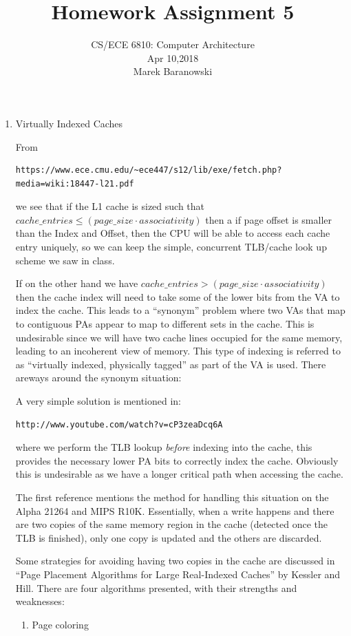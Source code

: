 \documentclass[a4paper, 11pt]{exam}
\title{Homework Assignment 5}
\subtitle{CS/ECE 6810: Computer Architecture \\
Apr 10,2018\\
Marek Baranowski}
\begin{document}
\maketitle
\begin{enumerate}
\item Virtually Indexed Caches

From 
\begin{verbatim}
https://www.ece.cmu.edu/~ece447/s12/lib/exe/fetch.php?media=wiki:18447-l21.pdf
\end{verbatim}
we see that if the L1 cache is sized such that 
$cache\_entries\le(page\_size\cdot associativity)$ then a if page offset is smaller
than the Index and Offset, then the CPU will be able to access each cache
entry uniquely, so we can keep the simple, concurrent TLB/cache look up scheme
we saw in class.

If on the other hand we have $cache\_entries>(page\_size\cdot associativity)$
then the cache index will need to take some of the lower bits from the VA to
index the cache. This leads to a ``synonym'' problem where two VAs that map
to contiguous PAs appear to map to different sets in the cache. This is 
undesirable since we will have two cache lines occupied for the same memory,
leading to an incoherent view of memory. This type of indexing is referred to
as ``virtually indexed, physically tagged'' as part of the VA is used. There 
areways around the synonym situation:

A very simple solution is mentioned in:
\begin{verbatim}http://www.youtube.com/watch?v=cP3zeaDcq6A\end{verbatim}
where we perform the TLB lookup {\em before} indexing into the cache, this
provides the necessary lower PA bits to correctly index the cache. Obviously
this is undesirable as we have a longer critical path when accessing the cache.

The first reference mentions the method for handling this situation on
the Alpha 21264 and MIPS R10K. Essentially, when a write happens and there are
two copies of the same memory region in the cache (detected once the TLB is
finished), only one copy is updated and the others are discarded.


Some strategies for avoiding having two copies in the cache are discussed in ``Page Placement Algorithms for Large 
Real-Indexed Caches'' by Kessler and Hill. There are four algorithms presented, with their strengths and weaknesses:
\begin{enumerate}
\item Page coloring


\end{enumerate}
\end{enumerate}
\end{document}
